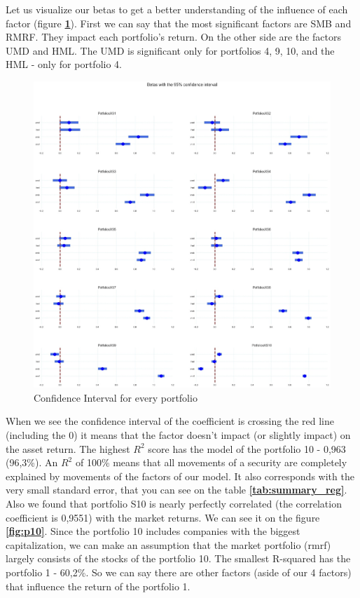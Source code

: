 \documentclass[11pt]{article}
\begin{document}
Let us visualize our betas to get a better understanding of the influence of each factor (figure \textbf{\ref{fig:conf_int}}). First we can say that the most significant factors are SMB and RMRF. 
They impact each portfolio’s return. On the other side are the factors UMD and HML. The UMD is significant only for portfolios 4, 9, 10, and the HML - only for portfolio 4.
\begin{figure}[H]
    \begin{center}
        \includegraphics[scale = .3]{conf_int.jpg}
    \end{center}
    \caption{Confidence Interval for every portfolio}
    \label{fig:conf_int}
\end{figure}
When we see the confidence interval of the coefficient is crossing the red line (including the 0) it means that the factor doesn’t impact (or slightly impact) on the asset return.
The highest $R^2$ score has the model of the portfolio 10 - 0,963 (96,3\%). 
An $R^2$ of 100\% means that all movements of a security are completely explained by movements of the factors of our model. It also corresponds with the very 
small standard error, that you can see on the table \textbf{\ref{tab:summary_reg}}. Also we found that portfolio S10 is nearly perfectly correlated (the correlation coefficient is 0,9551) 
with the market returns. We can see it on the figure \textbf{\ref{fig:p10}}. Since the portfolio 10 includes companies with the biggest capitalization, we can make an assumption that 
the market portfolio (rmrf) largely consists of the stocks of the portfolio 10. The smallest R-squared has the portfolio 1 - 60,2\%. So we can say there are other 
factors (aside of our 4 factors) that influence the return of the portfolio 1.
\end{document}
